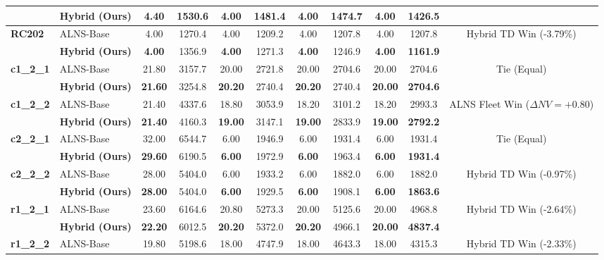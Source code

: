 \documentclass{article}
\begin{document}
\begin{table}[!htbp]
\begin{tabular*}{\textwidth}{@{\extracolsep{\fill}} ll cccccc cc c @{}}
 & \textbf{Hybrid (Ours)} & \textbf{4.40} & 1530.6 & \textbf{4.00} & 1481.4 & \textbf{4.00} & 1474.7 & \textbf{4.00} & \textbf{1426.5} & \\
\midrule
\multirow{2}{*}{\textbf{RC202}} & ALNS-Base & 4.00 & 1270.4 & 4.00 & 1209.2 & 4.00 & 1207.8 & 4.00 & 1207.8 & \multirow{2}{*}{Hybrid TD Win (-3.79\%)} \\
 & \textbf{Hybrid (Ours)} & \textbf{4.00} & 1356.9 & \textbf{4.00} & 1271.3 & \textbf{4.00} & 1246.9 & \textbf{4.00} & \textbf{1161.9} & \\
\midrule
\multirow{2}{*}{\textbf{c1\_2\_1}} & ALNS-Base & 21.80 & 3157.7 & 20.00 & 2721.8 & 20.00 & 2704.6 & 20.00 & 2704.6 & \multirow{2}{*}{Tie (Equal)} \\
 & \textbf{Hybrid (Ours)} & \textbf{21.60} & 3254.8 & \textbf{20.20} & 2740.4 & \textbf{20.20} & 2740.4 & \textbf{20.00} & \textbf{2704.6} & \\
\midrule
\multirow{2}{*}{\textbf{c1\_2\_2}} & ALNS-Base & 21.40 & 4337.6 & 18.80 & 3053.9 & 18.20 & 3101.2 & 18.20 & 2993.3 & \multirow{2}{*}{ALNS Fleet Win ($\Delta NV=+0.80$)} \\
 & \textbf{Hybrid (Ours)} & \textbf{21.40} & 4160.3 & \textbf{19.00} & 3147.1 & \textbf{19.00} & 2833.9 & \textbf{19.00} & \textbf{2792.2} & \\
\midrule
\multirow{2}{*}{\textbf{c2\_2\_1}} & ALNS-Base & 32.00 & 6544.7 & 6.00 & 1946.9 & 6.00 & 1931.4 & 6.00 & 1931.4 & \multirow{2}{*}{Tie (Equal)} \\
 & \textbf{Hybrid (Ours)} & \textbf{29.60} & 6190.5 & \textbf{6.00} & 1972.9 & \textbf{6.00} & 1963.4 & \textbf{6.00} & \textbf{1931.4} & \\
\midrule
\multirow{2}{*}{\textbf{c2\_2\_2}} & ALNS-Base & 28.00 & 5404.0 & 6.00 & 1933.2 & 6.00 & 1882.0 & 6.00 & 1882.0 & \multirow{2}{*}{Hybrid TD Win (-0.97\%)} \\
 & \textbf{Hybrid (Ours)} & \textbf{28.00} & 5404.0 & \textbf{6.00} & 1929.5 & \textbf{6.00} & 1908.1 & \textbf{6.00} & \textbf{1863.6} & \\
\midrule
\multirow{2}{*}{\textbf{r1\_2\_1}} & ALNS-Base & 23.60 & 6164.6 & 20.80 & 5273.3 & 20.00 & 5125.6 & 20.00 & 4968.8 & \multirow{2}{*}{Hybrid TD Win (-2.64\%)} \\
 & \textbf{Hybrid (Ours)} & \textbf{22.20} & 6012.5 & \textbf{20.20} & 5372.0 & \textbf{20.20} & 4966.1 & \textbf{20.00} & \textbf{4837.4} & \\
\midrule
\multirow{2}{*}{\textbf{r1\_2\_2}} & ALNS-Base & 19.80 & 5198.6 & 18.00 & 4747.9 & 18.00 & 4643.3 & 18.00 & 4315.3 & \multirow{2}{*}{Hybrid TD Win (-2.33\%)} \\

\end{tabular*}
\end{table}
\end{document}
